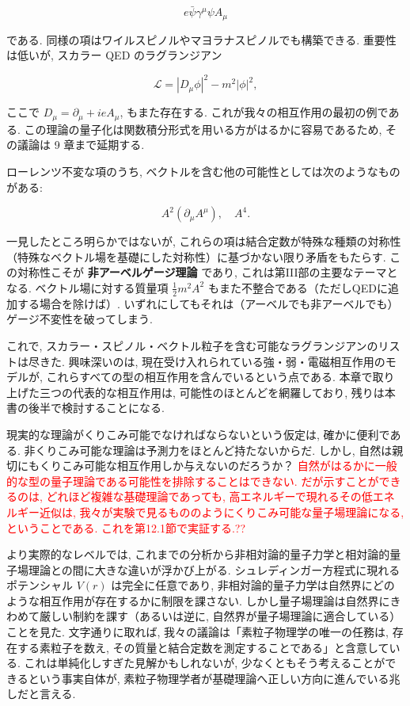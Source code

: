 \documentclass[a4paper,12pt]{article}
\begin{document}
\begin{equation*}
e \bar{\psi}\gamma^\mu \psi A_\mu
\end{equation*}

である. 
同様の項はワイルスピノルやマヨラナスピノルでも構築できる. 
重要性は低いが, スカラー QED のラグランジアン

\begin{equation*}
\mathcal{L} = |D_\mu \phi|^2 - m^2 |\phi|^2, 
\end{equation*}

ここで $D_\mu = \partial_\mu + ieA_\mu$, もまた存在する. 
これが我々の相互作用の最初の例である. この理論の量子化は関数積分形式を用いる方がはるかに容易であるため, その議論は 9 章まで延期する.

ローレンツ不変な項のうち, ベクトルを含む他の可能性としては次のようなものがある:

\begin{equation*}
A^2 (\partial_\mu A^\mu), \quad A^4 .
\end{equation*}

一見したところ明らかではないが, これらの項は結合定数が特殊な種類の対称性
（特殊なベクトル場を基礎にした対称性）に基づかない限り矛盾をもたらす. 
この対称性こそが \textbf{非アーベルゲージ理論} であり, これは第III部の主要なテーマとなる. 
ベクトル場に対する質量項 $\tfrac{1}{2} m^2 A^2$ もまた不整合である（ただしQEDに追加する場合を除けば）. 
いずれにしてもそれは（アーベルでも非アーベルでも）ゲージ不変性を破ってしまう.

これで, スカラー・スピノル・ベクトル粒子を含む可能なラグランジアンのリストは尽きた. 
興味深いのは, 現在受け入れられている強・弱・電磁相互作用のモデルが, 
これらすべての型の相互作用を含んでいるという点である. 
本章で取り上げた三つの代表的な相互作用は, 可能性のほとんどを網羅しており, 
残りは本書の後半で検討することになる.

現実的な理論がくりこみ可能でなければならないという仮定は, 確かに便利である. 
非くりこみ可能な理論は予測力をほとんど持たないからだ. 
しかし, 自然は親切にもくりこみ可能な相互作用しか与えないのだろうか？ 
\textcolor{red}{自然がはるかに一般的な型の量子理論である可能性を排除することはできない. 
だが示すことができるのは, どれほど複雑な基礎理論であっても, 高エネルギーで現れるその低エネルギー近似は, 
我々が実験で見るもののようにくりこみ可能な量子場理論になる, ということである. 
これを第12.1節で実証する.??}

より実際的なレベルでは, これまでの分析から非相対論的量子力学と相対論的量子場理論との間に大きな違いが浮かび上がる. 
シュレディンガー方程式に現れるポテンシャル $V(r)$ は完全に任意であり, 
非相対論的量子力学は自然界にどのような相互作用が存在するかに制限を課さない. 
しかし量子場理論は自然界にきわめて厳しい制約を課す（あるいは逆に, 自然界が量子場理論に適合している）ことを見た. 
文字通りに取れば, 我々の議論は「素粒子物理学の唯一の任務は, 
存在する素粒子を数え, その質量と結合定数を測定することである」と含意している. 
これは単純化しすぎた見解かもしれないが, 少なくともそう考えることができるという事実自体が, 
素粒子物理学者が基礎理論へ正しい方向に進んでいる兆しだと言える.
\end{document}
